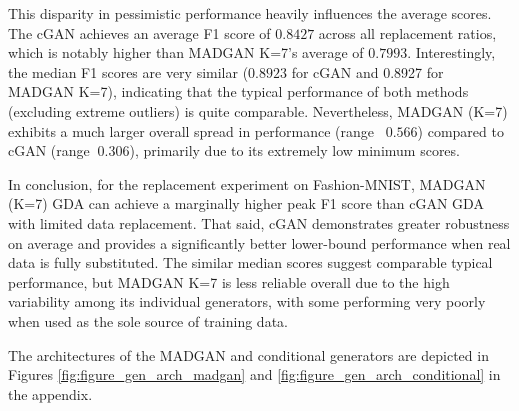 This disparity in pessimistic performance heavily influences the average scores. The cGAN achieves an average F1 score of $0.8427$ across all replacement ratios, which is notably higher than MADGAN K=7's average of $0.7993$. Interestingly, the median F1 scores are very similar ($0.8923$ for cGAN and 0.8927 for MADGAN K=7), indicating that the typical performance of both methods (excluding extreme outliers) is quite comparable. Nevertheless, MADGAN (K=7) exhibits a much larger overall spread in performance (range ~$0.566$) compared to cGAN (range $~0.306$), primarily due to its extremely low minimum scores.

In conclusion, for the replacement experiment on Fashion-MNIST, MADGAN (K=7) GDA can achieve a marginally higher peak F1 score than cGAN GDA with limited data replacement. That said, cGAN demonstrates greater robustness on average and provides a significantly better lower-bound performance when real data is fully substituted. The similar median scores suggest comparable typical performance, but MADGAN K=7 is less reliable overall due to the high variability among its individual generators, with some performing very poorly when used as the sole source of training data.

The architectures of the MADGAN and conditional generators are depicted in Figures \ref{fig:figure_gen_arch_madgan} and \ref{fig:figure_gen_arch_conditional} in the appendix.

